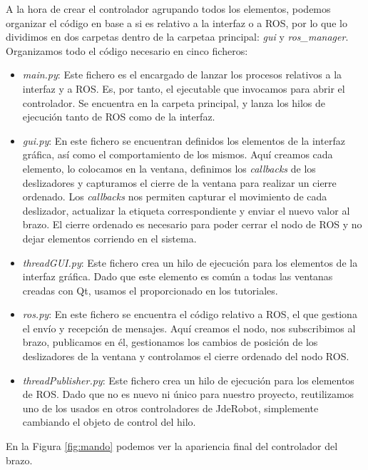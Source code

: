 A la hora de crear el controlador agrupando todos los elementos, podemos organizar el código en base a si es relativo a la interfaz o a ROS, por lo que lo dividimos en dos carpetas dentro de la carpetaa principal: \textit{gui} y \textit{ros\_manager}. Organizamos todo el código necesario en cinco ficheros:
\begin{itemize}
	\item \textit{main.py}: Este fichero es el encargado de lanzar los procesos relativos a la interfaz y a ROS. Es, por tanto, el ejecutable que invocamos para abrir el controlador. Se encuentra en la carpeta principal, y lanza los hilos de ejecución tanto de ROS como de la interfaz.
	
	\item \textit{gui.py}: En este fichero se encuentran definidos los elementos de la interfaz gráfica, así como el comportamiento de los mismos. Aquí creamos cada elemento, lo colocamos en la ventana, definimos los \textit{callbacks} de los deslizadores y capturamos el cierre de la ventana para realizar un cierre ordenado. Los \textit{callbacks} nos permiten capturar el movimiento de cada deslizador, actualizar la etiqueta correspondiente y enviar el nuevo valor al brazo. El cierre ordenado es necesario para poder cerrar el nodo de ROS y no dejar elementos corriendo en el sistema.
	
	\item \textit{threadGUI.py}: Este fichero crea un hilo de ejecución para los elementos de la interfaz gráfica. Dado que este elemento es común a todas las ventanas creadas con Qt, usamos el proporcionado en los tutoriales.
	
	\item \textit{ros.py}: En este fichero se encuentra el código relativo a ROS, el que gestiona el envío y recepción de mensajes. Aquí creamos el nodo, nos subscribimos al brazo, publicamos en él, gestionamos los cambios de posición de los deslizadores de la ventana y controlamos el cierre ordenado del nodo ROS.
	
	\item \textit{threadPublisher.py}: Este fichero crea un hilo de ejecución para los elementos de ROS. Dado que no es nuevo ni único para nuestro proyecto, reutilizamos uno de los usados en otros controladores de JdeRobot, simplemente cambiando el objeto de control del hilo.
	
\end{itemize}

En la Figura \ref{fig:mando} podemos ver la apariencia final del controlador del brazo.

